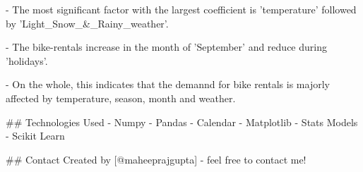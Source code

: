- The most significant factor with the largest coefficient is 'temperature' followed by 'Light_Snow_&_Rainy_weather'.

- The bike-rentals increase in the month of 'September' and reduce during 'holidays'.

- On the whole, this indicates that the demannd for bike rentals is majorly affected by temperature, season, month and weather.



## Technologies Used
- Numpy
- Pandas
- Calendar
- Matplotlib
- Stats Models
- Scikit Learn




## Contact
Created by [@maheeprajgupta] - feel free to contact me!